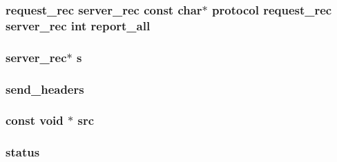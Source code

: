\subsubsection[{\texorpdfstring{report\+\_\+all}{report_all}}]{ {\bf request\+\_\+rec} {\bf server\+\_\+rec} const char$\ast$ {\bf protocol} {\bf request\+\_\+rec} {\bf server\+\_\+rec} {\bf int} report\+\_\+all}\hypertarget{group__APACHE__CORE__PROTO_ga744b8606483ea012f9c77bbe4c7b1732}{}\label{group__APACHE__CORE__PROTO_ga744b8606483ea012f9c77bbe4c7b1732}
\subsubsection[{\texorpdfstring{s}{s}}]{ {\bf server\+\_\+rec}$\ast$ s}\hypertarget{group__APACHE__CORE__PROTO_gabd83702f32647fad7e6a3f51b7851845}{}\label{group__APACHE__CORE__PROTO_gabd83702f32647fad7e6a3f51b7851845}
\subsubsection[{\texorpdfstring{send\+\_\+headers}{send_headers}}]{ send\+\_\+headers}\hypertarget{group__APACHE__CORE__PROTO_gac891dd64bc992a549275a12793e2b90a}{}\label{group__APACHE__CORE__PROTO_gac891dd64bc992a549275a12793e2b90a}
\subsubsection[{\texorpdfstring{src}{src}}]{\setlength{\rightskip}{0pt plus 5cm}const {\bf void} $\ast$ src}\hypertarget{group__APACHE__CORE__PROTO_ga3250c7d76063d957a24f2ecbb3d93c2c}{}\label{group__APACHE__CORE__PROTO_ga3250c7d76063d957a24f2ecbb3d93c2c}
\subsubsection[{\texorpdfstring{status}{status}}]{ status}\hypertarget{group__APACHE__CORE__PROTO_ga6e27f49150e9a14580fb313cc2777e00}{}\label{group__APACHE__CORE__PROTO_ga6e27f49150e9a14580fb313cc2777e00}
